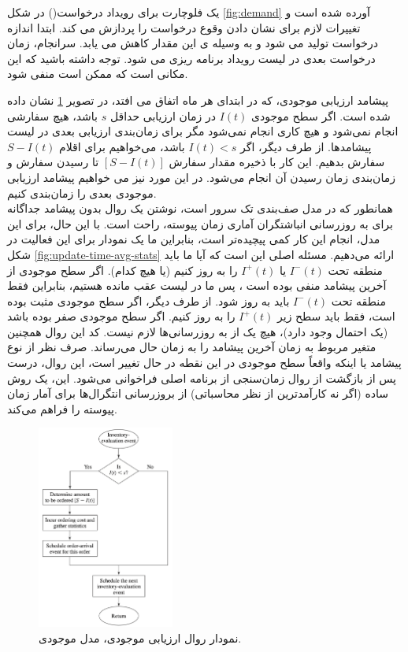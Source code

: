 \documentclass[12pt,a4paper]{report}
\begin{document}
یک فلوچارت برای رویداد درخواست() در شکل \ref{fig:demand}  آورده شده است و تغییرات لازم برای نشان دادن وقوع درخواست را پردازش می کند. ابتدا اندازه درخواست تولید می شود و  به وسیله ی این مقدار کاهش می یابد. سرانجام، زمان درخواست بعدی در لیست رویداد برنامه ریزی می شود. توجه داشته باشید که این مکانی است که ممکن است  منفی شود.

پیشامد ارزیابی موجودی، که در ابتدای هر ماه اتفاق می افتد، در تصویر \ref{fig:evaluate} نشان داده شده است. اگر سطح موجودی $I(t)$ در زمان ارزیابی حداقل $s$ باشد، هیچ سفارشی انجام نمی‌شود و هیچ کاری انجام نمی‌شود مگر برای زمان‌بندی ارزیابی بعدی در لیست پیشامدها. از طرف دیگر، اگر $I(t) < s$ باشد، می‌خواهیم برای اقلام $S - I(t)$ سفارش بدهیم. این کار با ذخیره مقدار سفارش $[S - I(t)]$ تا رسیدن سفارش و زمان‌بندی زمان رسیدن آن انجام می‌شود. در این مورد نیز می خواهیم پیشامد ارزیابی موجودی بعدی را زمان‌بندی کنیم.\\
همانطور که در مدل صف‌بندی تک سرور است، نوشتن یک روال بدون پیشامد جداگانه برای به روزرسانی انباشتگران آماری زمان پیوسته، راحت است. با این حال، برای این مدل، انجام این کار کمی پیچیده‌تر است، بنابراین ما یک نمودار برای این فعالیت در شکل \ref{fig:update-time-avg-stats} ارائه می‌دهیم. مسئله اصلی این است که آیا ما باید منطقه تحت $I^{-}(t)$ یا $I^{+}(t)$ را به روز کنیم (یا هیچ کدام). اگر سطح موجودی از آخرین پیشامد منفی بوده است ، پس ما در لیست عقب مانده هستیم، بنابراین فقط منطقه تحت $I^{-}(t)$ باید به روز شود. از طرف دیگر، اگر سطح موجودی مثبت بوده است، فقط باید سطح زیر $I^{+}(t)$ را به روز کنیم. اگر سطح موجودی صفر بوده باشد (یک احتمال وجود دارد)، هیچ یک از به روزرسانی‌ها لازم نیست. کد این روال همچنین متغیر مربوط به زمان آخرین پیشامد را به زمان حال می‌رساند. صرف نظر از نوع پیشامد یا اینکه واقعاً سطح موجودی در این نقطه در حال تغییر است، این روال، درست پس از بازگشت از روال زمان‌سنجی از برنامه اصلی فراخوانی می‌شود. این، یک روش ساده (اگر نه کارآمدترین از نظر محاسباتی) از بروزرسانی انتگرال‌ها برای آمار زمان پیوسته را فراهم می‌کند.
\begin{figure}[h]
\centering
\includegraphics[width=0.40\textwidth]{Figures/evaluate.png}
\caption{نمودار روال ارزیابی موجودی، مدل موجودی.}
\label{fig:evaluate}
\end{figure}
\end{document}

